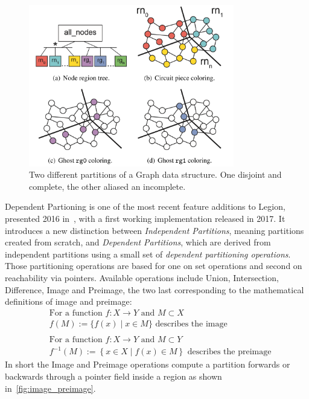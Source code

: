 \documentclass{article}      %
\begin{document}
\begin{figure}[htb]
	\centering
	\includegraphics[width=0.8\textwidth]{images/partitioning}
	\caption{Two different partitions of a Graph data structure. One disjoint and complete, the other aliased an incomplete.}\label{fig:partitioning}
\end{figure}

Dependent Partioning is one of the most recent feature additions to Legion, presented 2016 in~\cite{DependentPartitioning}, with a first working implementation released in 2017. It introduces a new distinction between \emph{Independent Partitions}, meaning partitions created from scratch, and \emph{Dependent Partitions}, which are derived from independent partitions using a small set of \emph{dependent partitioning operations}. Those partitioning operations are based for one on set operations and second on reachability via pointers. Available operations include Union, Intersection, Difference, Image and Preimage, the two last corresponding to the mathematical definitions of image and preimage:
\begin{align}
	\label{eq:imagePreimage}
	\nonumber & \text{For a function } f\colon X \to Y \text{ and } M \subset X                 \\
	          & f(M) := \{ f(x) \mid x \in M\} \text{ describes the image}                      \\
	\nonumber                                                                                   \\
	\nonumber & \text{For a function } f\colon X \to Y \text{ and } M \subset Y                 \\
	          & f^{-1}(M) := \left\{x\in X\mid f(x)\in M\right\} \text{ describes the preimage}
\end{align}
In short the Image and Preimage operations compute a partition forwards or backwards through a pointer field inside a region as shown in~\hyperref[fig:image_preimage]{\ref{fig:image_preimage}}.
\end{document}
